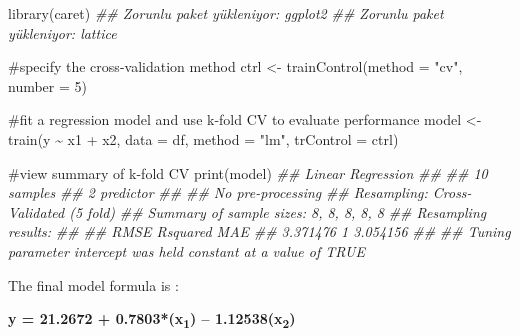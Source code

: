 \documentclass[
  letterpaper,
  DIV=11,
  numbers=noendperiod]{scrreprt}
\newenvironment{Shaded}{\begin{snugshade}}{\end{snugshade}}
\newcommand{\AttributeTok}[1]{\textcolor[rgb]{0.40,0.45,0.13}{#1}}
\newcommand{\CommentTok}[1]{\textcolor[rgb]{0.37,0.37,0.37}{#1}}
\newcommand{\DecValTok}[1]{\textcolor[rgb]{0.68,0.00,0.00}{#1}}
\newcommand{\DocumentationTok}[1]{\textcolor[rgb]{0.37,0.37,0.37}{\textit{#1}}}
\newcommand{\FunctionTok}[1]{\textcolor[rgb]{0.28,0.35,0.67}{#1}}
\newcommand{\NormalTok}[1]{\textcolor[rgb]{0.00,0.23,0.31}{#1}}
\newcommand{\OtherTok}[1]{\textcolor[rgb]{0.00,0.23,0.31}{#1}}
\newcommand{\SpecialCharTok}[1]{\textcolor[rgb]{0.37,0.37,0.37}{#1}}
\newcommand{\StringTok}[1]{\textcolor[rgb]{0.13,0.47,0.30}{#1}}
\begin{document}
\begin{Shaded}
\begin{Highlighting}[]
\FunctionTok{library}\NormalTok{(caret)}
\DocumentationTok{\#\# Zorunlu paket yükleniyor: ggplot2}
\DocumentationTok{\#\# Zorunlu paket yükleniyor: lattice}

\CommentTok{\#specify the cross{-}validation method}
\NormalTok{ctrl }\OtherTok{\textless{}{-}} \FunctionTok{trainControl}\NormalTok{(}\AttributeTok{method =} \StringTok{"cv"}\NormalTok{, }\AttributeTok{number =} \DecValTok{5}\NormalTok{)}

\CommentTok{\#fit a regression model and use k{-}fold CV to evaluate performance}
\NormalTok{model }\OtherTok{\textless{}{-}} \FunctionTok{train}\NormalTok{(y }\SpecialCharTok{\textasciitilde{}}\NormalTok{ x1 }\SpecialCharTok{+}\NormalTok{ x2, }\AttributeTok{data =}\NormalTok{ df, }\AttributeTok{method =} \StringTok{"lm"}\NormalTok{, }\AttributeTok{trControl =}\NormalTok{ ctrl)}

\CommentTok{\#view summary of k{-}fold CV               }
\FunctionTok{print}\NormalTok{(model)}
\DocumentationTok{\#\# Linear Regression }
\DocumentationTok{\#\# }
\DocumentationTok{\#\# 10 samples}
\DocumentationTok{\#\#  2 predictor}
\DocumentationTok{\#\# }
\DocumentationTok{\#\# No pre{-}processing}
\DocumentationTok{\#\# Resampling: Cross{-}Validated (5 fold) }
\DocumentationTok{\#\# Summary of sample sizes: 8, 8, 8, 8, 8 }
\DocumentationTok{\#\# Resampling results:}
\DocumentationTok{\#\# }
\DocumentationTok{\#\#   RMSE      Rsquared  MAE     }
\DocumentationTok{\#\#   3.371476  1         3.054156}
\DocumentationTok{\#\# }
\DocumentationTok{\#\# Tuning parameter \textquotesingle{}intercept\textquotesingle{} was held constant at a value of TRUE}
\end{Highlighting}
\end{Shaded}

The final model formula is :

\textbf{y = 21.2672 + 0.7803*(x\textsubscript{1}) --
1.12538(x\textsubscript{2})}

\begin{Shaded}
\end{Shaded}
\end{document}

